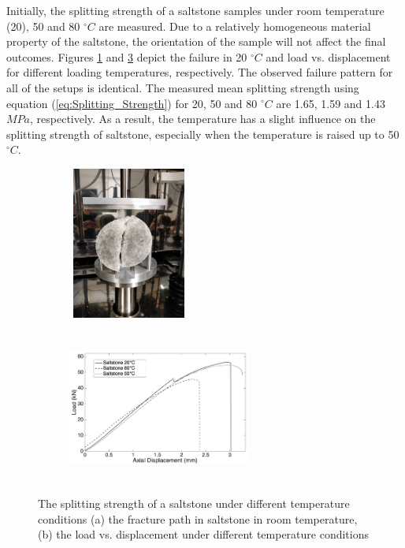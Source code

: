 Initially, the splitting strength of a saltstone samples under room temperature (20), 50 and 80 $^{\circ}C$ are measured. Due to a relatively homogeneous material property of the saltstone, the orientation of the sample will not affect the final outcomes. Figures \ref{fig:Amir_Splitting_Salt_20} and \ref{fig:Amir_Splitting_Salt_Result} depict the failure in 20 $^{\circ}C$ and load vs. displacement for different loading temperatures, respectively. The observed failure pattern for all of the setups is identical. The measured mean splitting strength using equation (\ref{eq:Splitting_Strength}) for 20, 50 and 80 $^{\circ}C$ are 1.65, 1.59 and 1.43 $MPa$, respectively. As a result, the temperature has a slight influence on the splitting strength of saltstone, especially when the temperature is raised up to 50 $^{\circ}C$.

\begin{figure}[!ht]
\centering
\begin{subfigure}[c]{0.35\textwidth}
\centering
\includegraphics[width=4cm,height=5cm]{figures/Amir_Splitting_Salt_20.png}
\subcaption{}
\label{fig:Amir_Splitting_Salt_20}
\end{subfigure}
\hfill
\begin{subfigure}[c]{0.6\textwidth}
\centering
\includegraphics[width=6cm,height=5cm]{figures/Amir_Splitting_Salt_Result.png}
\subcaption{}
\label{fig:Amir_Splitting_Salt_Result}
\end{subfigure}
\caption{The splitting strength of a saltstone under different temperature conditions (a) the fracture path in saltstone in room temperature, (b) the load vs. displacement under different temperature conditions}
\end{figure}

